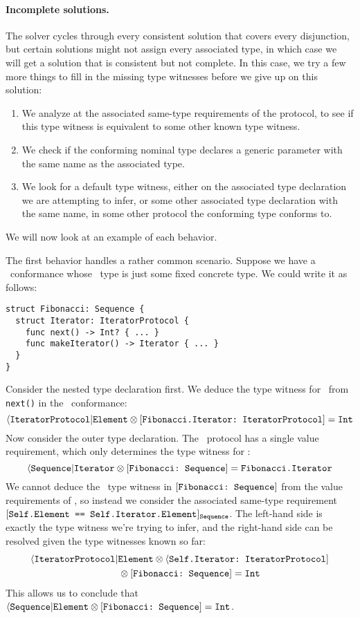 \documentclass[../generics]{subfiles}
\begin{document}
\paragraph{Incomplete solutions.} The solver cycles through every consistent solution that covers every disjunction, but certain solutions might not assign every associated type, in which case we will get a solution that is consistent but not complete. In this case, we try a few more things to fill in the missing type witnesses before we give up on this solution:
\begin{enumerate}
\item We analyze at the associated same-type requirements of the protocol, to see if this type witness is equivalent to some other known type witness.
\item We check if the conforming nominal type declares a generic parameter with the same name as the associated type.
\item We look for a default type witness, either on the associated type declaration we are attempting to infer, or some other associated type declaration with the same name, in some other protocol the conforming type conforms to.
\end{enumerate}
We will now look at an example of each behavior.

\begin{example}
The first behavior handles a rather common scenario. Suppose we have a \tSequence\ conformance whose \nElement\ type is just some fixed concrete type. We could write it as follows:
\begin{Verbatim}
struct Fibonacci: Sequence {
  struct Iterator: IteratorProtocol {
    func next() -> Int? { ... }
    func makeIterator() -> Iterator { ... }
  }
}
\end{Verbatim}
Consider the nested type declaration first. We deduce the type witness for \nElement\ from \texttt{next()} in the \tIterator\ conformance:
\[\langle\texttt{IteratorProtocol}|\texttt{Element}\otimes[\texttt{Fibonacci.Iterator:~IteratorProtocol}]=\texttt{Int}\]
Now consider the outer type declaration. The \tSequence\ protocol has a single value requirement, which only determines the type witness for \nIterator:
\[\langle\texttt{Sequence}|\texttt{Iterator}\otimes[\texttt{Fibonacci:~Sequence}]=\texttt{Fibonacci.Iterator}\]
We cannot deduce the \nElement\ type witness in $[\texttt{Fibonacci:~Sequence}]$ from the value requirements of \tSequence, so instead we consider the associated same-type requirement $[\texttt{Self.Element == Self.Iterator.Element}]_{\texttt{Sequence}}$. The left-hand side is exactly the type witness we're trying to infer, and the right-hand side can be resolved given the type witnesses known so far:
\begin{gather*}
\langle\texttt{IteratorProtocol}|\texttt{Element} \otimes \langle\texttt{Self.Iterator:~IteratorProtocol}] \\
\qquad {} \otimes [\texttt{Fibonacci:~Sequence}] = \texttt{Int}
\end{gather*}
This allows us to conclude that $\langle\texttt{Sequence}|\texttt{Element} \otimes[\texttt{Fibonacci:~Sequence}] = \texttt{Int}$.
\end{example}
\end{document}
